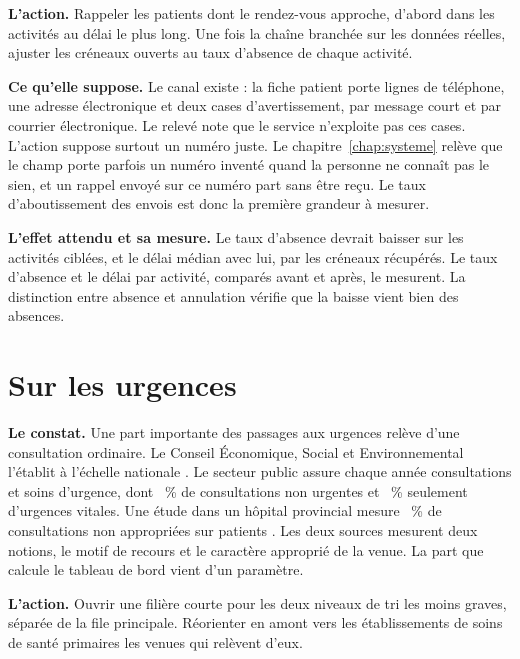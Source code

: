 \textbf{L'action.} Rappeler les patients dont le rendez-vous approche, d'abord dans les activités au
délai le plus long. Une fois la chaîne branchée sur les données réelles, ajuster les créneaux ouverts
au taux d'absence de chaque activité.

\textbf{Ce qu'elle suppose.} Le canal existe : la fiche patient porte  lignes de téléphone, une
adresse électronique et deux cases d'avertissement, par message court et par courrier
électronique. Le relevé note que le service n'exploite pas ces
cases. L'action suppose surtout un numéro juste. Le
chapitre~\ref{chap:systeme} relève que le champ porte parfois un numéro inventé quand la personne ne
connaît pas le sien, et un rappel envoyé sur ce numéro part sans être reçu. Le taux d'aboutissement
des envois est donc la première grandeur à mesurer.

\textbf{L'effet attendu et sa mesure.} Le taux d'absence devrait baisser sur les activités ciblées,
et le délai médian avec lui, par les créneaux récupérés. Le taux d'absence et le délai par activité,
comparés avant et après, le mesurent. La distinction entre absence et annulation vérifie que la
baisse vient bien des absences.

\section{Sur les urgences}

\textbf{Le constat.} Une part importante des passages aux urgences relève d'une consultation
ordinaire. Le Conseil Économique, Social et Environnemental l'établit à l'échelle nationale \cite{s12}. Le
secteur public assure chaque année  consultations et
soins d'urgence, dont ~\% de consultations non urgentes et
~\% seulement d'urgences vitales. Une
étude dans un hôpital provincial mesure ~\% de
consultations non appropriées sur  patients \cite{s13}.
Les deux sources mesurent deux notions, le motif de recours et le caractère approprié de la venue.
La part que calcule le tableau de bord vient d'un paramètre.

\textbf{L'action.} Ouvrir une filière courte pour les deux niveaux de tri les moins graves, séparée de
la file principale. Réorienter en amont vers les établissements de soins de santé primaires les
venues qui relèvent d'eux.

